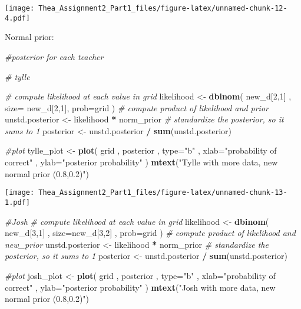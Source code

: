 \documentclass[]{article}
\newenvironment{Shaded}{\begin{snugshade}}{\end{snugshade}}
\newcommand{\KeywordTok}[1]{\textcolor[rgb]{0.13,0.29,0.53}{\textbf{#1}}}
\newcommand{\DataTypeTok}[1]{\textcolor[rgb]{0.13,0.29,0.53}{#1}}
\newcommand{\DecValTok}[1]{\textcolor[rgb]{0.00,0.00,0.81}{#1}}
\newcommand{\StringTok}[1]{\textcolor[rgb]{0.31,0.60,0.02}{#1}}
\newcommand{\CommentTok}[1]{\textcolor[rgb]{0.56,0.35,0.01}{\textit{#1}}}
\newcommand{\OperatorTok}[1]{\textcolor[rgb]{0.81,0.36,0.00}{\textbf{#1}}}
\newcommand{\NormalTok}[1]{#1}
\begin{document}
\texttt{[image: Thea\_Assignment2\_Part1\_files/figure-latex/unnamed-chunk-12-4.pdf]}

Normal prior:

\begin{Shaded}
\begin{Highlighting}[]
\CommentTok{#posterior for each teacher}

\CommentTok{# tylle}

\CommentTok{# compute likelihood at each value in grid}
\NormalTok{likelihood <-}\StringTok{ }\KeywordTok{dbinom}\NormalTok{( new_d[}\DecValTok{2}\NormalTok{,}\DecValTok{1}\NormalTok{] , }\DataTypeTok{size=}\NormalTok{ new_d[}\DecValTok{2}\NormalTok{,}\DecValTok{1}\NormalTok{], }\DataTypeTok{prob=}\NormalTok{grid )}
\CommentTok{# compute product of likelihood and prior}
\NormalTok{unstd.posterior <-}\StringTok{ }\NormalTok{likelihood }\OperatorTok{*}\StringTok{ }\NormalTok{norm_prior}
\CommentTok{# standardize the posterior, so it sums to 1}
\NormalTok{posterior <-}\StringTok{ }\NormalTok{unstd.posterior }\OperatorTok{/}\StringTok{ }\KeywordTok{sum}\NormalTok{(unstd.posterior)}

\CommentTok{#plot}
\NormalTok{tylle_plot <-}\StringTok{ }\KeywordTok{plot}\NormalTok{( grid , posterior , }\DataTypeTok{type=}\StringTok{"b"}\NormalTok{ ,}
    \DataTypeTok{xlab=}\StringTok{"probability of correct"}\NormalTok{ , }\DataTypeTok{ylab=}\StringTok{"posterior probability"}\NormalTok{ )}
\KeywordTok{mtext}\NormalTok{(}\StringTok{"Tylle with more data, new normal prior (0.8,0.2)"}\NormalTok{)}
\end{Highlighting}
\end{Shaded}

\texttt{[image: Thea\_Assignment2\_Part1\_files/figure-latex/unnamed-chunk-13-1.pdf]}

\begin{Shaded}
\begin{Highlighting}[]
\CommentTok{#Josh}
\CommentTok{# compute likelihood at each value in grid}
\NormalTok{likelihood <-}\StringTok{ }\KeywordTok{dbinom}\NormalTok{( new_d[}\DecValTok{3}\NormalTok{,}\DecValTok{1}\NormalTok{] , }\DataTypeTok{size=}\NormalTok{new_d[}\DecValTok{3}\NormalTok{,}\DecValTok{2}\NormalTok{] , }\DataTypeTok{prob=}\NormalTok{grid )}
\CommentTok{# compute product of likelihood and new_prior}
\NormalTok{unstd.posterior <-}\StringTok{ }\NormalTok{likelihood }\OperatorTok{*}\StringTok{ }\NormalTok{norm_prior}
\CommentTok{# standardize the posterior, so it sums to 1}
\NormalTok{posterior <-}\StringTok{ }\NormalTok{unstd.posterior }\OperatorTok{/}\StringTok{ }\KeywordTok{sum}\NormalTok{(unstd.posterior)}

\CommentTok{#plot}
\NormalTok{josh_plot <-}\StringTok{ }\KeywordTok{plot}\NormalTok{( grid , posterior , }\DataTypeTok{type=}\StringTok{"b"}\NormalTok{ ,}
    \DataTypeTok{xlab=}\StringTok{"probability of correct"}\NormalTok{ , }\DataTypeTok{ylab=}\StringTok{"posterior probability"}\NormalTok{ )}
\KeywordTok{mtext}\NormalTok{(}\StringTok{"Josh with more data, new normal prior (0.8,0.2)"}\NormalTok{)}
\end{Highlighting}
\end{Shaded}
\end{document}
